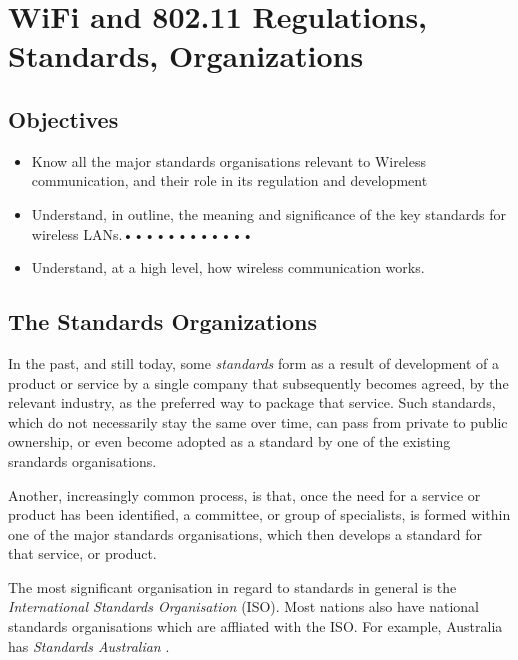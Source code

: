 \chapter{WiFi and 802.11 Regulations, Standards, Organizations}\label{wifi}

\minitoc 


\section*{Objectives}
\begin{itemize}

\item Know all the major standards organisations relevant to Wireless communication, and
	their role in its regulation and development

\item Understand, in outline, the meaning and significance of the key standards
	for wireless LANs.••••••••••••

\item Understand, at a high level, how wireless communication works.

\end{itemize}

\section{The Standards Organizations}

In the past, and still today, some {\em standards} form as a result of
development of a product or service by a single company that subsequently
becomes agreed, by the relevant industry, as the preferred way to package
that service. Such standards, which do not necessarily stay the same
over time, can pass from private to public ownership, or even
become adopted as a standard by one of the existing srandards organisations.

Another, increasingly common process, is that, once the need for a service
or product has been identified, a committee, or group of specialists,
is formed within one of the major standards organisations, which then
develops a standard for that service, or product.

The most significant organisation in regard to standards in general
is the {\em International Standards Organisation} (ISO).
Most nations also have national standards organisations which are
affliated with the ISO. For example, Australia has {\em Standards Australian}
\cite{SA}. 

